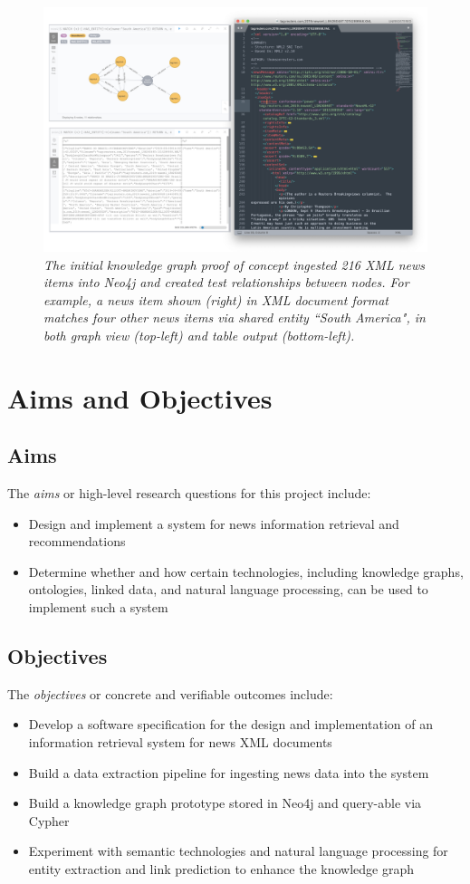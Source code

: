 \documentclass[11pt]{article}
\begin{document}
\begin{figure}
\centerline{\includegraphics[scale=0.25]{neo4j-proof-of-concept}}
\caption{\textit{The initial knowledge graph proof of concept ingested 216 XML news items into Neo4j and created test relationships between nodes. For example, a news item shown (right) in XML document format matches four other news items via shared entity ``South America", in both graph view (top-left) and table output (bottom-left).}}
\end{figure}

\newpage
\section{Aims and Objectives}
\label{sec:AimsObjectives}

\subsection{Aims}
The \textit{aims} or high-level research questions for this project include:
\begin{itemize}
  \item Design and implement a system for news information retrieval and recommendations
  \item Determine whether and how certain technologies, including knowledge graphs, ontologies, linked data, and natural language processing, can be used to implement such a system
\end{itemize}

\subsection{Objectives}
The \textit{objectives} or concrete and verifiable outcomes include:
\begin{itemize}
  \item Develop a software specification for the design and implementation of an information retrieval system for news XML documents
  \item Build a data extraction pipeline for ingesting news data into the system
  \item Build a knowledge graph prototype stored in Neo4j and query-able via Cypher
  \item Experiment with semantic technologies and natural language processing for entity extraction and link prediction to enhance the knowledge graph
\end{itemize}
\end{document}
